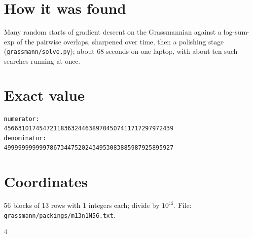 \documentclass[11pt,a4paper]{article}
\begin{document}
\section{How it was found}
Many random starts of gradient descent on the Grassmannian against a log-sum-exp of the pairwise overlaps, sharpened over time, then a polishing stage (\texttt{grassmann/solve.py}); about 68 seconds on one laptop, with about ten such searches running at once.


\appendix
\section{Exact value}
{\small
\begin{verbatim}
numerator:
456631017454721183632446389704507411717297972439
denominator:
499999999999786734475202434953083885987925895927
\end{verbatim}}

\section{Coordinates}
56 blocks of 13 rows with 1 integers each; divide by $10^{12}$. File: \texttt{grassmann/packings/m13n1N56.txt}.
{\tiny
\begin{multicols}{4}
\end{multicols}}
\end{document}
